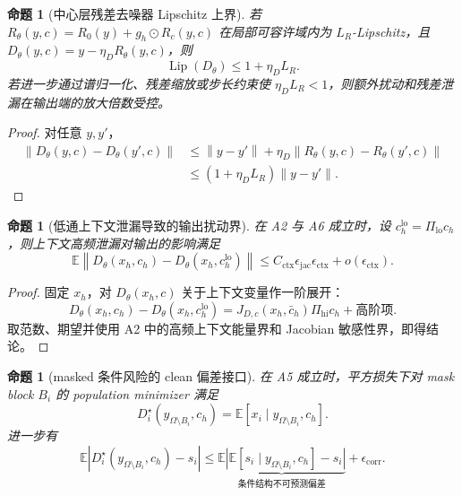\documentclass[11pt,a4paper,UTF8,fontset=fandol]{ctexart}
\newtheorem{proposition}[theorem]{命题}
\theoremstyle{definition}
\DeclareMathOperator{\Lip}{Lip}
\newcommand{\norm}[1]{\left\lVert#1\right\rVert}
\newcommand{\abs}[1]{\left\lvert#1\right\rvert}
\newcommand{\E}{\mathbb{E}}
\begin{document}
\begin{proposition}[中心层残差去噪器 Lipschitz 上界]
\label{prop:denoiser-lip-coreA}
若 $R_\theta(y,c)=R_0(y)+g_h\odot R_c(y,c)$ 在局部可容许域内为 $L_R$-Lipschitz，且 $D_\theta(y,c)=y-\eta_DR_\theta(y,c)$，则
\begin{equation}
    \Lip(D_\theta)\le1+\eta_D L_R.
\end{equation}
若进一步通过谱归一化、残差缩放或步长约束使 $\eta_DL_R<1$，则额外扰动和残差泄漏在输出端的放大倍数受控。
\end{proposition}

\begin{proof}
对任意 $y,y'$，
\begin{equation}
\begin{aligned}
    \norm{D_\theta(y,c)-D_\theta(y',c)}
    &\le\norm{y-y'}+\eta_D\norm{R_\theta(y,c)-R_\theta(y',c)}\\
    &\le(1+\eta_DL_R)\norm{y-y'}.
\end{aligned}
\end{equation}
\end{proof}

\begin{proposition}[低通上下文泄漏导致的输出扰动界]
\label{prop:context-leak-coreA}
在 A2 与 A6 成立时，设 $c_h^{\mathrm{lo}}=\Pi_{\mathrm{lo}}c_h$，则上下文高频泄漏对输出的影响满足
\begin{equation}
\label{eq:context-output-bound-coreA}
    \E\norm{D_\theta(x_h,c_h)-D_\theta(x_h,c_h^{\mathrm{lo}})}
    \le
    C_{\mathrm{ctx}}\epsilon_{\mathrm{jac}}\epsilon_{\mathrm{ctx}}+o(\epsilon_{\mathrm{ctx}}).
\end{equation}
\end{proposition}

\begin{proof}
固定 $x_h$，对 $D_\theta(x_h,c)$ 关于上下文变量作一阶展开：
\begin{equation}
    D_\theta(x_h,c_h)-D_\theta(x_h,c_h^{\mathrm{lo}})
    =J_{D,c}(x_h,\bar c_h)\Pi_{\mathrm{hi}}c_h+\text{高阶项}.
\end{equation}
取范数、期望并使用 A2 中的高频上下文能量界和 Jacobian 敏感性界，即得结论。
\end{proof}

\begin{proposition}[masked 条件风险的 clean 偏差接口]
\label{prop:masked-identifiability-coreA}
在 A5 成立时，平方损失下对 mask block $B_i$ 的 population minimizer 满足
\begin{equation}
\label{eq:masked-bayes-coreA}
    D_i^\star(y_{\Omega\setminus B_i},c_h)
    =\E[x_i\mid y_{\Omega\setminus B_i},c_h].
\end{equation}
进一步有
\begin{equation}
\label{eq:masked-clean-bias-coreA}
    \E\abs{D_i^\star(y_{\Omega\setminus B_i},c_h)-s_i}
    \le
    \underbrace{\E\abs{\E[s_i\mid y_{\Omega\setminus B_i},c_h]-s_i}}_{\text{条件结构不可预测偏差}}
    +\epsilon_{\mathrm{corr}}.
\end{equation}
\end{proposition}
\end{document}
